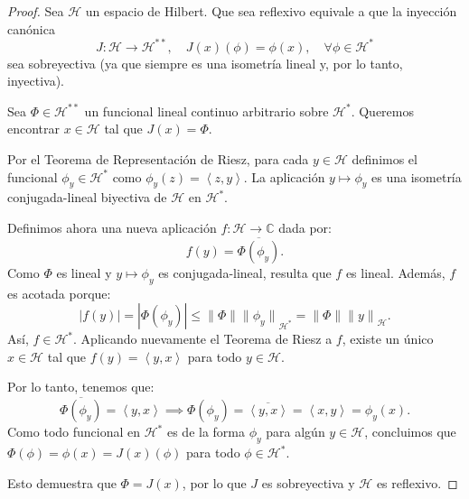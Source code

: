 \documentclass{article}
\theoremstyle{definition}
\newcommand{\ip}[2]{\left\langle #1, #2 \right\rangle}   %
\begin{document}
\begin{proof}
	Sea \( \mathcal{H} \) un espacio de Hilbert. Que sea reflexivo equivale a que la inyección canónica
	\[
		J: \mathcal{H} \to \mathcal{H}^{**}, \quad J(x)(\phi) = \phi(x), \quad \forall \phi \in \mathcal{H}^*
	\]
	sea sobreyectiva (ya que siempre es una isometría lineal y, por lo tanto, inyectiva).

	Sea \( \Phi \in \mathcal{H}^{**} \) un funcional lineal continuo arbitrario sobre \( \mathcal{H}^* \). Queremos encontrar \( x \in \mathcal{H} \) tal que \( J(x) = \Phi \).

	Por el Teorema de Representación de Riesz, para cada \( y \in \mathcal{H} \) definimos el funcional \( \phi_y \in \mathcal{H}^* \) como \( \phi_y(z) = \ip{z}{y} \). La aplicación \( y \mapsto \phi_y \) es una isometría conjugada-lineal biyectiva de \( \mathcal{H} \) en \( \mathcal{H}^* \).

	Definimos ahora una nueva aplicación \( f: \mathcal{H} \to \mathbb{C} \) dada por:
	\[
		f(y) = \overline{\Phi(\phi_y)}.
	\]
	Como \( \Phi \) es lineal y \( y \mapsto \phi_y \) es conjugada-lineal, resulta que \( f \) es lineal. Además, \( f \) es acotada porque:
	\[
		|f(y)| = |\Phi(\phi_y)| \le \| \Phi \| {\| \phi_y \|}_{\mathcal{H}^*} = \| \Phi \| {\| y \|}_{\mathcal{H}}.
	\]
	Así, \( f \in \mathcal{H}^* \). Aplicando nuevamente el Teorema de Riesz a \( f \), existe un único \( x \in \mathcal{H} \) tal que \( f(y) = \ip{y}{x} \) para todo \( y \in \mathcal{H} \).

	Por lo tanto, tenemos que:
	\[
		\overline{\Phi(\phi_y)} = \ip{y}{x} \implies \Phi(\phi_y) = \overline{\ip{y}{x}} = \ip{x}{y} = \phi_y(x).
	\]
	Como todo funcional en \( \mathcal{H}^* \) es de la forma \( \phi_y \) para algún \( y \in \mathcal{H} \), concluimos que \( \Phi(\phi) = \phi(x) = J(x)(\phi) \) para todo \( \phi \in \mathcal{H}^* \).

	Esto demuestra que \( \Phi = J(x) \), por lo que \( J \) es sobreyectiva y \( \mathcal{H} \) es reflexivo.
\end{proof}

\vspace{0.5cm}
\end{document}
